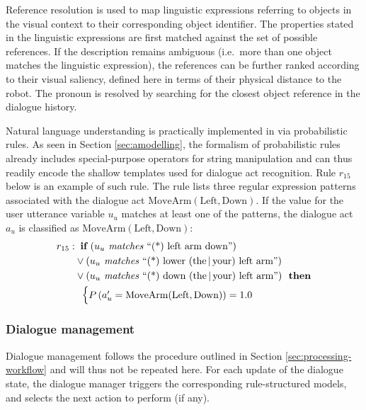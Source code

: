 Reference resolution is used to map linguistic expressions referring to objects in the visual context to their corresponding object identifier. The properties stated in the linguistic expressions are first matched against the set of possible references.  If the description remains ambiguous (i.e.\ more than one object matches the linguistic expression), the references can be further ranked according to their visual saliency, defined here in terms of their physical distance to the robot.  The pronoun  is resolved by searching for the closest object reference in the dialogue history. 

Natural language understanding is practically implemented in \opendial{} via probabilistic rules.  As seen in Section \ref{sec:amodelling}, the formalism of probabilistic rules already includes special-purpose operators for string manipulation and can thus readily encode the shallow templates used for dialogue act recognition.  Rule $r_{15}$ below is an example of such rule.  The rule lists three regular expression patterns associated with the dialogue act $\mathrm{MoveArm(Left,Down)}$.  If the value for the user utterance variable $u_u$ matches at least one of the patterns, the dialogue act $a_u$ is classified as $\mathrm{MoveArm(Left,Down)}$:
\begin{align*}
r_{15}: &\;\;\textbf{if} \ (u_u \textit{ matches } \text{``(*) left arm down''} ) \\ 
& \lor (u_u \textit{ matches } \text{``(*) lower (the\,|\,your) left arm''} ) \\
& \lor (u_u \textit{ matches } \text{``(*) down (the\,|\,your) left arm''}   )  \ \ \textbf{then} \\ 
& \; \; \begin{cases} P\left(a_u' = \mathrm{MoveArm(Left,Down)}\right) = 1.0 \end{cases}
\end{align*}

\subsubsection*{Dialogue management}

Dialogue management follows the procedure outlined in Section \ref{sec:processing-workflow} and will thus not be repeated here. For each update of the dialogue state, the dialogue manager triggers the corresponding rule-structured models, and selects the next action to perform (if any). 


